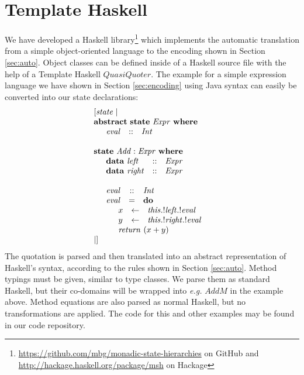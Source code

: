 \section{Template Haskell}
\label{sec:th}

We have developed a Haskell library\footnote{\url{https://github.com/mbg/monadic-state-hierarchies} on GitHub and \url{http://hackage.haskell.org/package/msh} on Hackage} which implements the automatic translation from a simple object-oriented language to the encoding shown in Section \ref{sec:auto}. Object classes can be defined inside of a Haskell source file with the help of a Template Haskell $\mathit{QuasiQuoter}$\cite{mainland2007s}. The example for a simple expression language we have shown in Section \ref{sec:encoding} using Java syntax can easily be converted into our state declarations:
\begin{displaymath}
\begin{array}{l}
[\mathit{state}\mid\\\mathbf{abstract}~\mathbf{state}~\mathit{Expr}~\mathbf{where} \\
\quad \begin{array}{lcl}
\mathit{eval} & :: & \mathit{Int}\\
\end{array}\\\\
\mathbf{state}~\mathit{Add} : \mathit{Expr}~\mathbf{where} \\
\quad \begin{array}{lcl}
\mathbf{data}~\mathit{left} & :: & \mathit{Expr} \\
\mathbf{data}~\mathit{right}  & :: & \mathit{Expr}
\end{array}\\\\
\quad \begin{array}{lcl}
\mathit{eval} & :: & \mathit{Int}\\
\mathit{eval} & = & \mathbf{do} \\
\multicolumn{3}{l}{\quad  \begin{array}{lcl}
x & \leftarrow & \mathit{this}.!\mathit{left}.!\mathit{eval}\\
y & \leftarrow & \mathit{this}.!\mathit{right}.!\mathit{eval}\\
\multicolumn{3}{l}{\mathit{return}~(x + y) }
\end{array}} 
\end{array}\\
\mid]
\end{array}
\end{displaymath}
The quotation is parsed and then translated into an abstract representation of Haskell's syntax, according to the rules shown in Section \ref{sec:auto}. Method typings must be given, similar to type classes. We parse them as standard Haskell, but their co-domains will be wrapped into \emph{e.g.} $\mathit{AddM}$ in the example above. Method equations are also parsed as normal Haskell, but no transformations are applied. The code for this and other examples may be found in our code repository.


